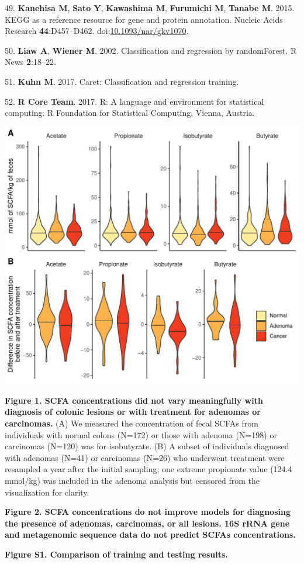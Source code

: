 \documentclass[11pt,]{article}
\begin{document}
\leavevmode\hypertarget{ref-Kanehisa2015}{}%
49. \textbf{Kanehisa M}, \textbf{Sato Y}, \textbf{Kawashima M},
\textbf{Furumichi M}, \textbf{Tanabe M}. 2015. KEGG as a reference
resource for gene and protein annotation. Nucleic Acids Research
\textbf{44}:D457--D462.
doi:\href{https://doi.org/10.1093/nar/gkv1070}{10.1093/nar/gkv1070}.

\leavevmode\hypertarget{ref-Liaw2002}{}%
50. \textbf{Liaw A}, \textbf{Wiener M}. 2002. Classification and
regression by randomForest. R News \textbf{2}:18--22.

\leavevmode\hypertarget{ref-Kuhn2017}{}%
51. \textbf{Kuhn M}. 2017. Caret: Classification and regression
training.

\leavevmode\hypertarget{ref-r_citation_2017}{}%
52. \textbf{R Core Team}. 2017. R: A language and environment for
statistical computing. R Foundation for Statistical Computing, Vienna,
Austria.

\newpage

\includegraphics{../results/figures/scfa_abundance.pdf}

\textbf{Figure 1. SCFA concentrations did not vary meaningfully with
diagnosis of colonic lesions or with treatment for adenomas or
carcinomas.} (A) We measured the concentration of fecal SCFAs from
individuals with normal colons (N=172) or those with adenoma (N=198) or
carcinomas (N=120) was for isobutyrate. (B) A subset of individuals
diagnosed with adenomas (N=41) or carcinomas (N=26) who underwent
treatment were resampled a year after the initial sampling; one extreme
propionate value (124.4 mmol/kg) was included in the adenoma analysis
but censored from the visualization for clarity.

\newpage

\textbf{Figure 2. SCFA concentrations do not improve models for
diagnosing the presence of adenomas, carcinomas, or all lesions. 16S
rRNA gene and metagenomic sequence data do not predict SCFAs
concentrations.}

\newpage

\textbf{Figure S1. Comparison of training and testing results.}
\end{document}

